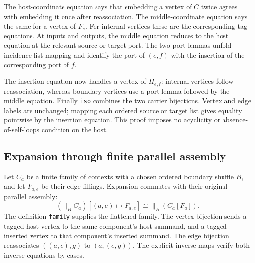 
The host-coordinate equation says that embedding a vertex of $C$ twice agrees
with embedding it once after reassociation. The middle-coordinate equation
says the same for a vertex of $F_e$. For internal vertices these are the
corresponding tag equations. At inputs and outputs, the middle equation reduces
to the host equation at the relevant source or target port. The two port lemmas
unfold incidence-list mapping and identify the port of $(e,f)$ with the insertion
of the corresponding port of $f$.


The insertion equation now handles a vertex of $H_{e,f}$: internal vertices
follow reassociation, whereas boundary vertices use a port lemma followed by
the middle equation. Finally \texttt{iso} combines the two carrier bijections.
Vertex and edge labels are unchanged; mapping each ordered source or target
list gives equality pointwise by the insertion equation. This proof imposes
no acyclicity or absence-of-self-loops condition on the host.


\subsection{Expansion through finite parallel assembly}
Let $C_a$ be a finite family of contexts with a chosen ordered boundary shuffle
$B$, and let $F_{a,e}$ be their edge fillings. Expansion commutes with their
original parallel assembly:
\[
 (\mathop{\|}\nolimits_B C_a)[(a,e)\mapsto F_{a,e}]
 \cong \mathop{\|}\nolimits_B(C_a[F_a]).
\]
The definition \texttt{family} supplies the flattened family. The vertex
bijection sends a tagged host vertex to the same component's host summand,
and a tagged inserted vertex to that component's inserted summand. The edge
bijection reassociates $((a,e),g)$ to $(a,(e,g))$. The explicit inverse maps
verify both inverse equations by cases.

